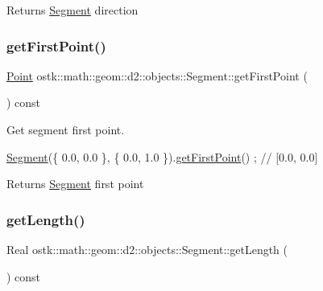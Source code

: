 \begin{DoxyReturn}{Returns}
\hyperlink{classostk_1_1math_1_1geom_1_1d2_1_1objects_1_1_segment}{Segment} direction 
\end{DoxyReturn}
\mbox{\label{classostk_1_1math_1_1geom_1_1d2_1_1objects_1_1_segment_a8c91be64413c5944403dcd61daa141ae}} 
\subsubsection{\texorpdfstring{get\+First\+Point()}{getFirstPoint()}}
{\footnotesize\ttfamily \hyperlink{classostk_1_1math_1_1geom_1_1d2_1_1objects_1_1_point}{Point} ostk\+::math\+::geom\+::d2\+::objects\+::\+Segment\+::get\+First\+Point (\begin{DoxyParamCaption}{ }\end{DoxyParamCaption}) const}



Get segment first point. 


\begin{DoxyCode}
\hyperlink{classostk_1_1math_1_1geom_1_1d2_1_1objects_1_1_segment_a56c91f22315d7cefe9d5e9973330028d}{Segment}(\{ 0.0, 0.0 \}, \{ 0.0, 1.0 \}).\hyperlink{classostk_1_1math_1_1geom_1_1d2_1_1objects_1_1_segment_a8c91be64413c5944403dcd61daa141ae}{getFirstPoint}() ; \textcolor{comment}{// [0.0, 0.0]}
\end{DoxyCode}


\begin{DoxyReturn}{Returns}
\hyperlink{classostk_1_1math_1_1geom_1_1d2_1_1objects_1_1_segment}{Segment} first point 
\end{DoxyReturn}
\mbox{\label{classostk_1_1math_1_1geom_1_1d2_1_1objects_1_1_segment_a9e6dcd2b0d921c755b6980f457ed7f3e}} 
\subsubsection{\texorpdfstring{get\+Length()}{getLength()}}
{\footnotesize\ttfamily Real ostk\+::math\+::geom\+::d2\+::objects\+::\+Segment\+::get\+Length (\begin{DoxyParamCaption}{ }\end{DoxyParamCaption}) const}



